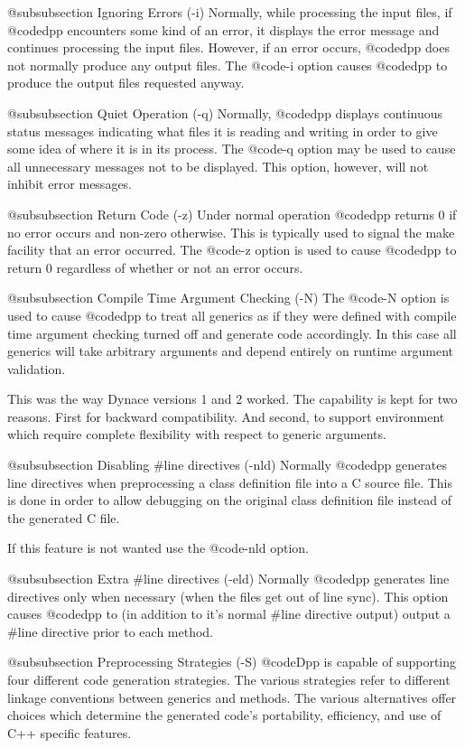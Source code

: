 @subsubsection Ignoring Errors (-i)
Normally, while processing the input files, if @code{dpp} encounters
some kind of an error, it displays the error message and continues
processing the input files.  However, if an error occurs, @code{dpp}
does not normally produce any output files.  The @code{-i} option
causes @code{dpp} to produce the output files requested anyway.

@subsubsection Quiet Operation (-q)
Normally, @code{dpp} displays continuous status messages indicating
what files it is reading and writing in order to give some idea
of where it is in its process.  The @code{-q} option may be
used to cause all unnecessary messages not to be displayed.
This option, however, will not inhibit error messages.

@subsubsection Return Code (-z)
Under normal operation @code{dpp} returns 0 if no error occurs and
non-zero otherwise.  This is typically used to signal the make
facility that an error occurred.  The @code{-z} option is used to cause
@code{dpp} to return 0 regardless of whether or not an error occurs.

@subsubsection Compile Time Argument Checking (-N)
The @code{-N} option is used to cause @code{dpp} to treat all generics
as if they were defined with compile time argument checking turned off
and generate code accordingly.  In this case all generics will take
arbitrary arguments and depend entirely on runtime argument validation.

This was the way Dynace versions 1 and 2 worked.  The capability is kept
for two reasons.  First for backward compatibility.  And second, to
support environment which require complete flexibility with respect to
generic arguments.

@subsubsection Disabling #line directives (-nld)
Normally @code{dpp} generates line directives when preprocessing
a class definition file into a C source file.  This is done in order
to allow debugging on the original class definition file instead
of the generated C file.

If this feature is not wanted use the @code{-nld} option.

@subsubsection Extra #line directives (-eld)
Normally @code{dpp} generates line directives only when necessary
(when the files get out of line sync).  This option causes @code{dpp}
to (in addition to it's normal #line directive output) output a
#line directive prior to each method.

@subsubsection Preprocessing Strategies (-S)
@code{Dpp} is capable of supporting four different code generation
strategies.  The various strategies refer to different linkage
conventions between generics and methods.  The various alternatives
offer choices which determine the generated code's portability,
efficiency, and use of C++ specific features.

